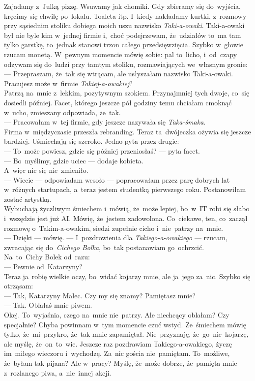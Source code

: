 \documentclass[9pt, a5paper]{memoir}
\begin{document}
Zajadamy z~Julką pizzę. Wsuwamy jak chomiki. Gdy zbieramy się do~wyjścia, kręcimy się chwilę po~lokalu. Toaleta itp. I~kiedy nakładamy kurtki, z~rozmowy przy sąsiednim stoliku dobiega moich uszu nazwisko \textit{Taki-a-owaki}. Taki-a-owaki był nie byle kim w~jednej firmie i,~choć podejrzewam, że~udziałów to~ma tam tylko garstkę, to~jednak stanowi trzon całego przedsięwzięcia. Szybko w~głowie rzucam monetą. W~pewnym momencie mówię sobie: pal to~licho, i~od~czapy odzywam się do~ludzi przy tamtym stoliku, rozmawiających we~własnym gronie:\\
--- Przepraszam, że~tak się wtrącam, ale usłyszałam nazwisko Taki-a-owaki. Pracujesz może w~firmie \textit{Takiej-a-owakiej}?\\
Patrzą na~mnie z~lekkim, pozytywnym szokiem. Przynajmniej tych dwoje, co~się dosiedli później. Facet, którego jeszcze pół godziny temu chciałam cmoknąć w~ucho, zmieszany odpowiada, że~tak.\\
--- Pracowałam w~tej firmie, gdy jeszcze nazywała się \textit{Taka-śmaka}.\\
Firma w~międzyczasie przeszła rebranding. Teraz ta~dwójeczka ożywia się jeszcze bardziej. Uśmiechają się szeroko. Jedno pyta przez drugie:\\
--- To~może powiesz, gdzie się później przeniosłaś? --- pyta facet.\\
--- Bo~myślimy, gdzie uciec --- dodaje kobieta.\\
A~więc nic się nie~zmieniło.\\
--- Wiecie --- odpowiadam wesoło --- popracowałam przez parę dobrych lat w~różnych startupach, a~teraz jestem studentką pierwszego roku. Postanowiłam zostać artystką.\\
Wybuchają życzliwym śmiechem i~mówią, że~może lepiej, bo~w~IT robi się słabo i~wszędzie jest już AI. Mówię, że~jestem zadowolona. Co~ciekawe, ten, co~zaczął rozmowę o~Takim-a-owakim, siedzi zupełnie cicho i~nie~patrzy na~mnie.\\
--- Dzięki --- mówię. --- I~pozdrowienia dla \textit{Takiego-a-owakiego} --- rzucam, zwracając się do~\textit{Cichego Bolka}, bo~tak postanawiam go~ochrzcić.\\
Na~to~Cichy Bolek od~razu:\\
--- Pewnie od~Katarzyny?\\
Teraz ja~robię wielkie oczy, bo~widać kojarzy mnie, ale ja~jego za~nic. Szybko się otrząsam:\\
--- Tak, Katarzyny Malec. Czy my się znamy? Pamiętasz mnie?\\
--- Tak. Oblałaś mnie piwem.\\
Okej. To~wyjaśnia, czego na~mnie nie~patrzy. Ale niechcący oblałam? Czy specjalnie? Chyba powinnam w~tym momencie czuć wstyd. Ze~śmiechem mówię tylko, że~mi~przykro, że~tak mnie zapamiętał. Nie~przyznaję, że~go~nie~kojarzę, ale myślę, że~on~to~wie. Jeszcze raz pozdrawiam Takiego-a-owakiego, życzę im~miłego wieczoru i~wychodzę. Za~nic gościa nie~pamiętam. To~możliwe, że~byłam tak pijana? Ale w~pracy? Myślę, że~może dobrze, że~pamięta mnie z~rozlanego piwa, a~nie~innej akcji.
\end{document}
